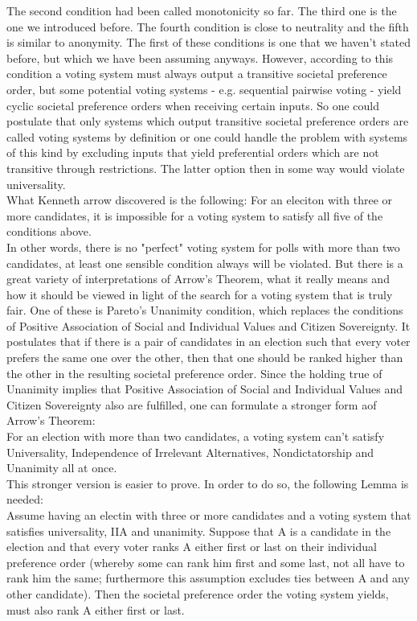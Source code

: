 The second condition had been called monotonicity so far. The third one is the one we introduced before. The fourth condition is close to neutrality and the fifth is similar to anonymity. 
The first of these conditions is one that we haven't stated before, but which we have been assuming anyways. However, according to this condition a voting system must always output a transitive societal preference order, but some potential voting systems - e.g. sequential pairwise voting - yield cyclic societal preference orders when receiving certain inputs. So one could postulate that only systems which output transitive societal preference orders are called voting systems by definition or one could handle the problem with systems of this kind by excluding inputs that yield preferential orders which are not transitive through restrictions. The latter option then in some way would violate universality. \\
What Kenneth arrow discovered is the following: For an eleciton with three or more candidates, it is impossible for a voting system to satisfy all five of the conditions above. \\
In other words, there is no "perfect" voting system for polls with more than two candidates, at least one sensible condition always will be violated. But there is a great variety of interpretations of Arrow's Theorem, what it really means and how it should be viewed in light of the search for a voting system that is truly fair. 
One of these is Pareto's Unanimity condition, which replaces the conditions of Positive Association of Social and Individual Values and Citizen Sovereignty. It postulates that if there is a pair of candidates in an election such that every voter prefers the same one over the other, then that one should be ranked higher than the other in the resulting societal preference order. 
Since the holding true of Unanimity implies that Positive Association of Social and Individual Values and Citizen Sovereignty also are fulfilled, one can formulate a stronger form aof Arrow's Theorem: \\
For an election with more than two candidates, a voting system can't satisfy Universality, Independence of Irrelevant Alternatives, Nondictatorship and Unanimity all at once. \\

This stronger version is easier to prove. In order to do so, the following Lemma is needed: \\

Assume having an electin with three or more candidates and a voting system that satisfies universality, IIA and unanimity. Suppose that A is a candidate in the election and that every voter ranks A either first or last on their individual preference order (whereby some can rank him first and some last, not all have to rank him the same; furthermore this assumption excludes ties between A and any other candidate). Then the societal preference order the voting system yields, must also rank A either first or last. \\

